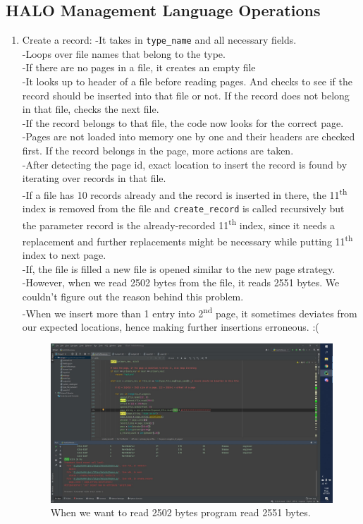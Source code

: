 \documentclass{article}
\begin{document}
\subsection{HALO Management Language Operations}
\begin{enumerate}
    \item Create a record: -It takes in \texttt{type\_name} and all necessary fields. \\
-Loops over file names that belong to the type.\\
-If there are no pages in a file, it creates an empty file\\
-It looks up to header of a file before reading pages. And checks to see if the record should be inserted into that file or not. If the record does not belong in that file, checks the next file.\\
-If the record belongs to that file, the code now looks for the correct page.\\
-Pages are not loaded into memory one by one and their headers are checked first. If the record belongs in the page, more actions are taken. \\
-After detecting the page id, exact location to insert the record is found by iterating over records in that file.\\
-If a file has 10 records already and the record is inserted in there, the 11\textsuperscript{th} index is removed from the file and \texttt{create\_record} is called recursively but the parameter record is the already-recorded 11\textsuperscript{th} index, since it needs a replacement and further replacements might be necessary while putting 11\textsuperscript{th} index to next page.\\
-If, the file is filled a new file is opened similar to the new page strategy.\\
-However, when we read 2502 bytes from the file, it reads 2551 bytes. We couldn’t figure out the reason behind this problem.\\
-When we insert more than 1 entry into 2\textsuperscript{nd} page, it sometimes deviates from our expected locations, hence making further insertions erroneous. :(

    
\begin{figure}[H]
\centering
\includegraphics[width=.99\textwidth]{byte_problems.jpg}
\caption{When we want to read 2502 bytes program read 2551 bytes.}
\end{figure}


\end{enumerate}
\end{document}
